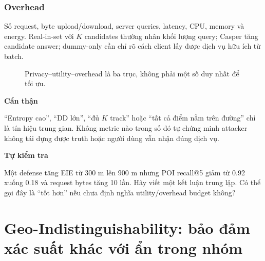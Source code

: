 \documentclass[11pt,a4paper,oneside]{report}
\newcommand{\attacker}{\textcolor{purple}{\textbf{kẻ tấn công}}}
\newenvironment{warningbox}[1][Cẩn thận]{%
  \par\medskip\noindent\begin{lrbox}{\warningstore}\begin{minipage}{.89\textwidth}
  {\sffamily\bfseries\color{red}#1}\par\smallskip}{%
  \end{minipage}\end{lrbox}\begin{center}\setlength{\fboxsep}{7pt}%
  \fcolorbox{red}{lightred}{\usebox{\warningstore}}\end{center}\medskip}
\newenvironment{exercisebox}[1][Tự kiểm tra]{%
  \par\medskip\noindent\begin{lrbox}{\exercisestore}\begin{minipage}{.89\textwidth}
  {\sffamily\bfseries\color{amber}#1}\par\smallskip}{%
  \end{minipage}\end{lrbox}\begin{center}\setlength{\fboxsep}{7pt}%
  \fcolorbox{amber}{lightamber}{\usebox{\exercisestore}}\end{center}\medskip}
\begin{document}
\subsection{Overhead}

Số request, byte upload/download, server queries, latency, CPU, memory và energy.
Real-in-set với $K$ candidates thường nhân khối lượng query; Casper tăng candidate
answer; dummy-only cần chỉ rõ cách client lấy được dịch vụ hữu ích từ batch.

\begin{figure}[htbp]
\centering
{}
\caption{Privacy--utility--overhead là ba trục, không phải một số duy nhất để tối ưu.}
\label{fig:metric-triangle}
\end{figure}

\begin{warningbox}
``Entropy cao'', ``DD lớn'', ``đủ $K$ track'' hoặc ``tất cả điểm nằm trên đường''
chỉ là tín hiệu trung gian. Không metric nào trong số đó tự chứng minh attacker
không tái dựng được truth hoặc người dùng vẫn nhận đúng dịch vụ.
\end{warningbox}

\begin{exercisebox}
Một defense tăng EIE từ 300 m lên 900 m nhưng POI recall@5 giảm từ 0.92 xuống
0.18 và request bytes tăng 10 lần. Hãy viết một kết luận trung lập. Có thể gọi đây
là ``tốt hơn'' nếu chưa định nghĩa utility/overhead budget không?
\end{exercisebox}

\chapter{Geo-Indistinguishability: bảo đảm xác suất khác với ẩn trong nhóm}
\end{document}
